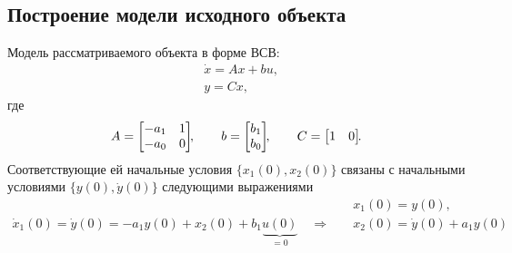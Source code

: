 \subsection{Построение модели исходного объекта}
Модель рассматриваемого объекта в форме ВСВ:
\begin{align}
    & \dot{x} = Ax + bu, \label{eq_state_space_model_of_plant}\\
    & y = Cx,
\end{align}
где
\begin{equation}
    A =
    \begin{bmatrix}
        -a_1 & 1 \\
        -a_0 & 0
    \end{bmatrix}\!\!,
    \qquad
    b = 
    \begin{bmatrix}
        b_1 \\ b_0
    \end{bmatrix}\!\!,
    \qquad
    C =
    \begin{bmatrix}
        1 & 0
    \end{bmatrix}\!\!\ldotp
\end{equation}
Соответствующие ей начальные условия $\{x_1(0), x_2(0)\}$ связаны с начальными условиями $\{y(0), \dot{y}(0)\}$ следующими выражениями
\begin{align}
    & x_1(0) = y(0), \\
    \dot{x}_1(0) = \dot{y}(0) = -a_1 y(0) + x_2(0) + b_1 \underbrace{u(0)}_{=0}
    \quad \Rightarrow \quad
    & x_2(0) = \dot{y}(0) + a_1 y(0) 
\end{align}


